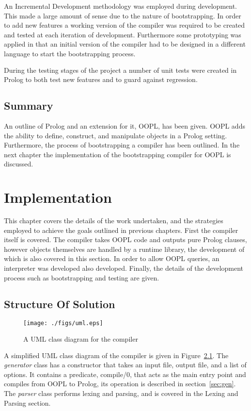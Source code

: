 \documentclass[12pt,a4paper,twoside,openright]{report}
\begin{document}
An Incremental Development methodology was employed during development. This made a large amount of sense due to the nature of bootstrapping. In order to add new features a working version of the compiler was required to be created and tested at each iteration of development. Furthermore some prototyping was applied in that an initial version of the compiler had to be designed in a different language to start the bootstrapping process.

\bigskip

During the testing stages of the project a number of unit tests were created in Prolog to both test new features and to guard against regression. 

\section {Summary}

An outline of Prolog and an extension for it, OOPL, has been given. OOPL adds the ability to define, construct, and manipulate objects in a Prolog setting. Furthermore, the process of bootstrapping a compiler has been outlined. In the next chapter the implementation of the bootstrapping compiler for OOPL is discussed.

\chapter{Implementation}


This chapter covers the details of the work undertaken, and the strategies employed to achieve the goals outlined in previous chapters. First the compiler itself is covered. The compiler takes OOPL code and outputs pure Prolog clauses, however objects themselves are handled by a runtime library, the development of which is also covered in this section. In order to allow OOPL queries, an interpreter was developed also developed. Finally, the details of the development process such as bootstrapping and testing are given.

\section{Structure Of Solution}

\begin{figure}
\texttt{[image: ./figs/uml.eps]}
\caption{A UML class diagram for the compiler}
\label{fig:1}
\end{figure}

A simplified UML class diagram of the compiler is given in Figure~\ref{fig:1}. The \emph{generator} class has a constructor that takes an input file, output file, and a list of options. It contains a predicate, compile/0, that acts as the main entry point and compiles from OOPL to Prolog, its operation is described in section~\ref{sec:gen}. The \emph{parser} class performs lexing and parsing, and is covered in the Lexing and Parsing section.
\end{document}
